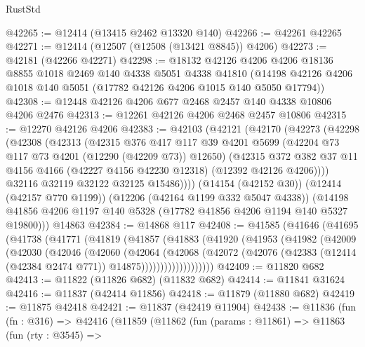 \begin{lexlean}{RustStd}
\begin{coremodule}
{\begin{coremodule}
{{{{{{{{{{{{{{{{{{{{{{{{{{{{{{{{{{{{{{{{{{{{{{{{{{@42265 := @12414 (@13415 @2462 @13320 @140)
@42266 := @42261 @42265
@42271 := @12414 (@12507 (@12508 (@13421 @8845)) @4206)
@42273 := @42181 (@42266 @42271)
@42298 := @18132
    @42126
    @4206
    @4206
    @18136
    @8855
    @1018
    @2469
    @140
    @4338
    @5051
    @4338
    @41810
    (@14198 @42126 @4206 @1018 @140 @5051 (@17782 @42126 @4206 @1015 @140 @5050 @17794))
@42308 := @12448 @42126 @4206 @677 @2468 @2457 @140 @4338 @10806 @4206 @2476
@42313 := @12261 @42126 @4206 @2468 @2457 @10806
@42315 := @12270 @42126 @4206
@42383 := @42103
    (@42121
      (@42170
        (@42273
          (@42298
            (@42308
              (@42313
                (@42315
                  @376
                  @417
                  @117
                  @39
                  @4201
                  @5699
                  (@42204 @73 @117 @73 @4201 (@12290 (@42209 @73)) @12650)
                  (@42315
                    @372
                    @382
                    @37
                    @11
                    @4156
                    @4166
                    (@42227 @4156 @42230 @12318)
                    (@12392 @42126 @4206))))
              @32116
              @32119
              @32122
              @32125
              @15486))))
      (@14154 (@42152 @30))
      (@12414 (@42157 @770 @1199))
      (@12206 (@42164 @1199 @332 @5047 @4338))
      (@14198 @41856 @4206 @1197 @140 @5328 (@17782 @41856 @4206 @1194 @140 @5327 @19800)))
    @14863
@42384 := @14868 @117
@42408 := @41585
    (@41646
      (@41695
        (@41738
          (@41771
            (@41819
              (@41857
                (@41883
                  (@41920
                    (@41953
                      (@41982
                        (@42009
                          (@42030
                            (@42046
                              (@42060
                                (@42064
                                  (@42068
                                    (@42072
                                      (@42076
                                        (@42383
                                          (@12414 (@42384 @2474 @771))
                                          @14875)))))))))))))))))))
@42409 := @11820 @682
@42413 := @11822 (@11826 @682) (@11832 @682)
@42414 := @11841 @31624
@42416 := @11837 (@42414 @11856)
@42418 := @11879 (@11880 @682)
@42419 := @11875 @42418
@42421 := @11837 (@42419 @11904)
@42438 := @11836
    (fun (fn : @316) =>
    @42416
      (@11859
        (@11862
          (fun (params : @11861) =>
          @11863
            (fun (rty : @3545) =>
}}}}}}}}}}}}}}}}}}}}}}}}}}}}}}}}}}}}}}}}}}}}}}}}}}
\end{coremodule}}
\end{coremodule}
\end{lexlean}
